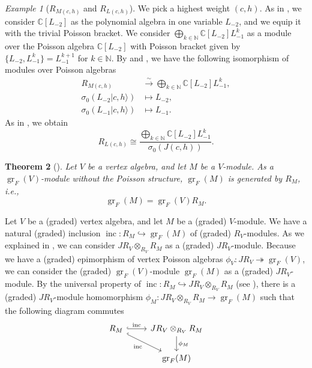 \documentclass[a4paper, 12pt, reqno]{amsart}
\newtheorem{theorem}{Theorem}[section]
\theoremstyle{remark}
\newtheorem{example}[theorem]{Example}
\DeclareMathOperator{\gr}{gr}
\DeclareMathOperator{\inc}{inc}
\begin{document}
\begin{example}[$R_{M(c, h)}$ and $R_{L(c, h)}$]
  \label{exa:10}
  We pick a highest weight $(c, h)$.
  As in , we consider $\mathbb{C}[L_{-2}]$ as the polynomial algebra in one variable $L_{-2}$, and we equip it with the trivial Poisson bracket.
  We consider $\bigoplus_{k \in \mathbb{N}}\mathbb{C}[L_{-2}]L_{-1}^k$ as a module over the Poisson algebra $\mathbb{C}[L_{-2}]$ with Poisson bracket given by $\{L_{-2}, L_{-1}^k\} = L_{-1}^{k + 1}$ for $k \in \mathbb{N}$.
  By  and , we have the following isomorphism of modules over Poisson algebras
  \begin{align*}
    R_{M(c, h)} &\xrightarrow{\sim} \bigoplus_{k \in \mathbb{N}}\mathbb{C}[L_{-2}]L_{-1}^k, \\
    \sigma_0(L_{-2}|c, h\rangle) &\mapsto L_{-2}, \\
    \sigma_0(L_{-1}|c, h\rangle) &\mapsto L_{-1}.
  \end{align*}
  As in , we obtain
  \begin{equation*}
    R_{L(c, h)} \cong \frac{\bigoplus_{k \in \mathbb{N}}\mathbb{C}[L_{-2}]L_{-1}^k}{\sigma_0(J(c, h))}.
  \end{equation*}
\end{example}

\begin{theorem}[{\cite[Lemma 4.2]{li_abelianizing_2005}}]
  \label{thr:6}
  Let $V$ be a vertex algebra, and let $M$ be a $V$-module.
  As a $\gr_F(V)$-module without the Poisson structure, $\gr_F(M)$ is generated by $R_M$, i.e.,
  \begin{equation*}
    \gr_F(M) = \gr_F(V)R_M.
  \end{equation*}
\end{theorem}

Let $V$ be a (graded) vertex algebra, and let $M$ be a (graded) $V$-module.
We have a natural (graded) inclusion $\inc: R_M \hookrightarrow \gr_F(M)$ of (graded) $R_V$-modules.
As we explained in , we can consider $JR_V \otimes_{R_V} R_M$ as a (graded) $JR_V$-module.
Because we have a (graded) epimorphism of vertex Poisson algebras $\phi_V: JR_V \twoheadrightarrow \gr_F(V)$, we can consider the (graded) $\gr_F(V)$-module $\gr_F(M)$ as a (graded) $JR_V$-module.
By the universal property of $\inc: R_M \hookrightarrow JR_V \otimes_{R_V} R_M$ (see ), there is a (graded) $JR_V$-module homomorphism $\phi_M: JR_V \otimes_{R_V} R_M \to \gr_F(M)$ such that the following diagram commutes
\begin{equation*}
  \begin{tikzcd}
    R_M \arrow[r, "\inc", hook] \arrow[rd, "\inc"', hook] & JR_V \otimes_{R_V} R_M \arrow[d, "\phi_M"] \\
    & \gr_F(M)
  \end{tikzcd}
\end{equation*}
\end{document}
